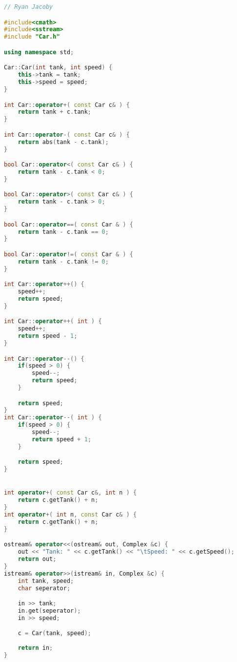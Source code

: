 \documentclass[letterpaper, 11pt]{article}
\begin{document}
\begin{lstlisting}[language=c++, caption=Car.cpp]
// Ryan Jacoby

#include<cmath>
#include<sstream>
#include "Car.h"

using namespace std;

Car::Car(int tank, int speed) {
    this->tank = tank;
    this->speed = speed;
}

int Car::operator+( const Car c& ) {
    return tank + c.tank;
}

int Car::operator-( const Car c& ) {
    return abs(tank - c.tank);
}

bool Car::operator<( const Car c& ) {
    return tank - c.tank < 0;
}

bool Car::operator>( const Car c& ) {
    return tank - c.tank > 0;
}

bool Car::operator==( const Car & ) {
    return tank - c.tank == 0;
}

bool Car::operator!=( const Car & ) {
    return tank - c.tank != 0;
}

int Car::operator++() {
    speed++;
    return speed;
}

int Car::operator++( int ) {
    speed++;
    return speed - 1;
}

int Car::operator--() {
    if(speed > 0) {
        speed--;
        return speed;
    }

    return speed;
}
int Car::operator--( int ) {
    if(speed > 0) {
        speed--;
        return speed + 1;
    }

    return speed;
}


int operator+( const Car c&, int n ) {
    return c.getTank() + n;
}
int operator+( int n, const Car c& ) {
    return c.getTank() + n;
}

ostream& operator<<(ostream& out, Complex &c) {
    out << "Tank: " << c.getTank() << "\tSpeed: " << c.getSpeed();
    return out;
}
istream& operator>>(istream& in, Complex &c) {
    int tank, speed;
    char seperator;

    in >> tank;
    in.get(seperator);
    in >> speed;

    c = Car(tank, speed);
    
    return in;
}
\end{lstlisting}
\end{document}
